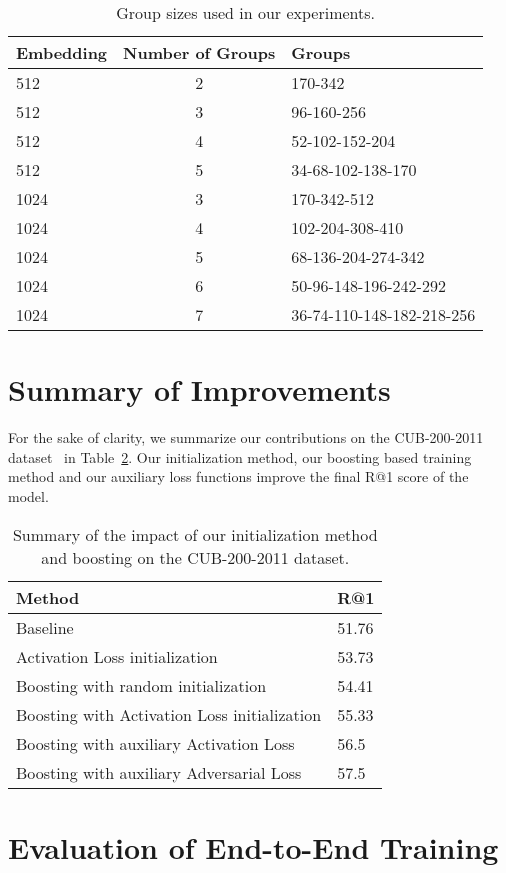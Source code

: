 \documentclass[10pt,journal,compsoc]{IEEEtran}
\begin{document}
\begin{table}[htbp]
    \caption{Group sizes used in our experiments.}
    \label{tbl:group-sizes}
    \renewcommand{\arraystretch}{1.3}
    \centering
    \begin{tabular}{lcl}
        \hline
        Embedding & Number of Groups & Groups \\
        \hline
        512            & 2 & 170-342 \\
        512            & 3 & 96-160-256 \\
        512            & 4 & 52-102-152-204 \\
        512            & 5 & 34-68-102-138-170 \\
        \hline
        1024           & 3 & 170-342-512 \\
        1024           & 4 & 102-204-308-410 \\
        1024           & 5 & 68-136-204-274-342 \\
        1024           & 6 & 50-96-148-196-242-292 \\
        1024           & 7 & 36-74-110-148-182-218-256 \\
        \hline
    \end{tabular}
\end{table}\section{Summary of Improvements}\label{sec:impact-matrix-initialization}

For the sake of clarity, we summarize our contributions on the CUB-200-2011 dataset~\cite{WahCUB_200_2011} in Table~\ref{tbl:boosting-impact}.
Our initialization method, our boosting
based training method and our auxiliary loss functions improve the final R@1 score of the model.

\begin{table}[htbp]
    \caption{Summary of the impact of our initialization method and boosting on the CUB-200-2011 dataset.}
    \label{tbl:boosting-impact}
    \renewcommand{\arraystretch}{1.3}
    \centering
    \begin{tabular}{ll}
        \hline
        Method & R@1 \\
        \hline
        Baseline & 51.76 \\
        Activation Loss initialization & 53.73 \\
        Boosting with random initialization & 54.41 \\
        Boosting with Activation Loss initialization & 55.33 \\
        \hline
        Boosting with auxiliary Activation Loss & 56.5 \\
        Boosting with auxiliary Adversarial Loss & 57.5 \\
        \hline
    \end{tabular}

\end{table}\section{Evaluation of End-to-End Training}\label{sec:end-to-end-training}
\end{document}
